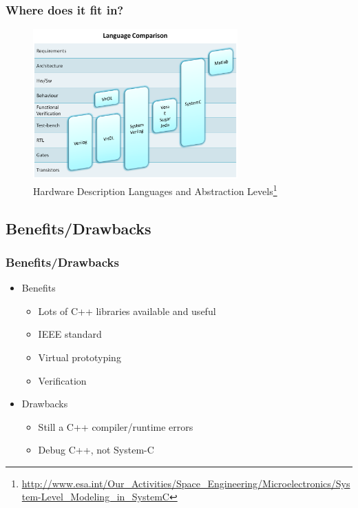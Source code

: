\documentclass{beamer}
\begin{document}
\begin{frame}\frametitle{Where does it fit in?} 
	    \begin{figure}[hp]
	      \centering
	      \includegraphics[width=0.7\textwidth]{pictures/Hardware_Description_Languages_and_Abstraction_Levels.png}
	      \caption{Hardware Description Languages and Abstraction Levels\footnote[frame]{\url{http://www.esa.int/Our_Activities/Space_Engineering/Microelectronics/System-Level_Modeling_in_SystemC}}}
	      \label{fig:flow}
	    \end{figure} 

\end{frame}

\subsection{Benefits/Drawbacks}
\begin{frame}\frametitle{Benefits/Drawbacks} 
\begin{itemize}
	\item Benefits
	\begin{itemize}
		\item Lots of C++ libraries available and useful
		\item IEEE standard
		\item Virtual prototyping
		\item Verification
	\end{itemize}
	\item Drawbacks \begin{itemize}
		\item Still a C++ compiler/runtime errors
		\item Debug C++, not System-C
	\end{itemize}
\end{itemize}
\end{frame}
\end{document}
